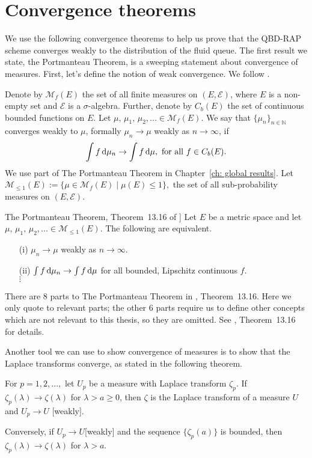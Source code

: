 \section{Convergence theorems}
We use the following convergence theorems to help us prove that the QBD-RAP scheme converges weakly to the distribution of the fluid queue. The first result we state, the Portmanteau Theorem, is a sweeping statement about convergence of measures. First, let's define the notion of weak convergence. We follow \cite{portmanteaubook}. 

Denote by \(\mathcal M_f(E)\) the set of all finite measures on \((E,\mathcal E)\), where \(E\) is a non-empty set and \(\mathcal E\) is a \(\sigma\)-algebra. Further, denote by \(C_b(E)\) the set of continuous bounded functions on \(E\). Let \(\mu,\,\mu_1,\,\mu_2,...\in \mathcal M_f(E)\). We say that \(\{\mu_n\}_{n\in\mathbb N}\) converges weakly to \(\mu\), formally \(\mu_n\to \mu\) weakly as \(n\to\infty\), if 
\[\int f \, \mathrm{d} \mu_n \to \int f\, \mathrm{d} \mu,\mbox{ for all }f \in C_b(E).\]
We use part of The Portmanteau Theorem in Chapter~\ref{ch: global results}. Let \(\mathcal M_{\leq 1}(E):=\{\mu \in \mathcal M_f(E)\mid \mu(E)\leq 1\},\) the set of all sub-probability measures on \((E,\mathcal E)\). 
\begin{thm}[[Part of] The Portmanteau Theorem, Theorem~13.16 of \cite{portmanteaubook}]
	Let \(E\) be a metric space and let \(\mu,\, \mu_1,\,\mu_2,... \in \mathcal M_{\leq 1}(E)\). The following are equivalent.
	\begin{enumerate}
		\item[(i)] \(\mu_n\to \mu\) weakly as \(n\to \infty\). 
		\item[(ii)] \(\int f\, \mathrm{d} \mu_n \to \int f\, \mathrm{d} \mu\) for all bounded, Lipschitz continuous \(f\).
		\\ \(\vdots\) 
	\end{enumerate}
\end{thm}
There are 8 parts to The Portmanteau Theorem in \cite{portmanteaubook}, Theorem~13.16. Here we only quote to relevant parts; the other 6 parts require us to define other concepts which are not relevant to this thesis, so they are omitted. See \cite{portmanteaubook}, Theorem~13.16 for details. 

Another tool we can use to show convergence of measures is to show that the Laplace transforms converge, as stated in the following theorem.
\begin{thm}\label{thm: ext cont thm}
	For \(p=1,2,...,\) let \(U_p\) be a measure with Laplace transform \(\zeta_p\). If \(\zeta_p(\lambda)\to\zeta(\lambda)\) for \(\lambda > a\geq 0\), then \(\zeta\) is the Laplace transform of a measure \(U\) and \(U_p\to U\) [weakly].
	
	Conversely, if \(U_p\to U\)[weakly] and the sequence \(\{\zeta_p(a)\}\) is bounded, then \(\zeta_p(\lambda)\to\zeta(\lambda)\) for \(\lambda >a\). 
\end{thm}

